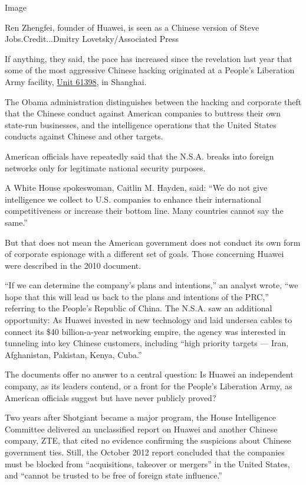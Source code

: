 Image

Ren Zhengfei, founder of Huawei, is seen as a Chinese version of Steve
Jobs.Credit...Dmitry Lovetsky/Associated Press

If anything, they said, the pace has increased since the revelation last
year that some of the most aggressive Chinese hacking originated at a
People's Liberation Army facility,
\href{http://www.nytimes.com/2013/02/19/technology/chinas-army-is-seen-as-tied-to-hacking-against-us.html?_r=0\&gwh=1F8882CC86CB87898C237E9DC1989D5D\&gwt=regi}{Unit
61398}, in Shanghai.

The Obama administration distinguishes between the hacking and corporate
theft that the Chinese conduct against American companies to buttress
their own state-run businesses, and the intelligence operations that the
United States conducts against Chinese and other targets.

American officials have repeatedly said that the N.S.A. breaks into
foreign networks only for legitimate national security purposes.

A White House spokeswoman, Caitlin M. Hayden, said: ``We do not give
intelligence we collect to U.S. companies to enhance their international
competitiveness or increase their bottom line. Many countries cannot say
the same.''

But that does not mean the American government does not conduct its own
form of corporate espionage with a different set of goals. Those
concerning Huawei were described in the 2010 document.

``If we can determine the company's plans and intentions,'' an analyst
wrote, ``we hope that this will lead us back to the plans and intentions
of the PRC,'' referring to the People's Republic of China. The N.S.A.
saw an additional opportunity: As Huawei invested in new technology and
laid undersea cables to connect its \$40 billion-a-year networking
empire, the agency was interested in tunneling into key Chinese
customers, including ``high priority targets --- Iran, Afghanistan,
Pakistan, Kenya, Cuba.''

The documents offer no answer to a central question: Is Huawei an
independent company, as its leaders contend, or a front for the People's
Liberation Army, as American officials suggest but have never publicly
proved?

Two years after Shotgiant became a major program, the House Intelligence
Committee delivered an unclassified report on Huawei and another Chinese
company, ZTE, that cited no evidence confirming the suspicions about
Chinese government ties. Still, the October 2012 report concluded that
the companies must be blocked from ``acquisitions, takeover or mergers''
in the United States, and ``cannot be trusted to be free of foreign
state influence.''

